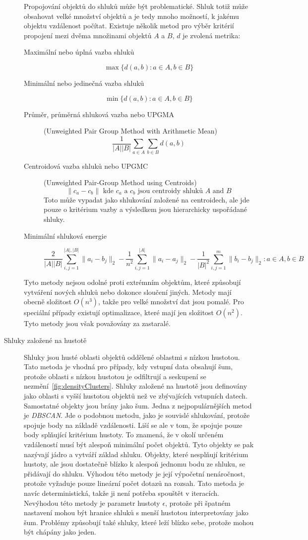 \begin{description}
Propojování objektů do shluků může být problematické. Shluk totiž může obsahovat velké množství objektů a je tedy mnoho možností, k jakému objektu vzdálenost počítat. Existuje několik metod pro výběr kritérií propojení mezi dvěma množinami objektů $A$ a $B$, $d$ je zvolená metrika:
\begin{description}
\item[Maximální nebo úplná vazba shluků] $$\max\{d(a,b) : a \in A, b \in B\}$$
\item[Minimální nebo jedinečná vazba shluků] $$\min\{d(a,b) : a \in A, b \in B\}$$
\item[Průměr, průměrná shluková vazba nebo UPGMA] (Unweighted Pair Group Method with Arithmetic Mean) $$\frac{1}{|A||B|}\sum_{a \in A} \sum_{b \in B} d(a,b)$$
\item[Centroidová vazba shluků nebo UPGMC] (Unweighted Pair-Group Method using Centroids) $$\|c_a - c_b\| \mbox{ kde } c_a \mbox{ a } c_b \mbox{ jsou centroidy shluků } A \mbox{ and } B$$
Toto může vypadat jako shlukování založené na centroidech, ale jde pouze o kritérium vazby a výsledkem jsou hierarchicky uspořádané shluky.
\item[Minimální shluková energie] $$\frac{2}{|A||B|}\sum_{i,j=1}^{|A|,|B|}\|a_i-b_j\|_2-\frac{1}{n^2}\sum_{i,j=1}^{|A|}\|a_i-a_j\|_2-\frac{1}{|B|^2}\sum_{i,j=1}^{m}\|b_{i}-b_{j}\|_{2} : a \in A, b \in B$$
\end{description}

Tyto metody nejsou odolné proti extrémním objektům, které způsobují vytváření nových shluků nebo dokonce sloučení jiných. Metody mají obecně složitost $O(n^3) $, takže pro velké množství dat jsou pomalé. Pro speciální případy existují optimalizace, které mají jen složitost $O(n^2) $. Tyto metody jsou však považovány za zastaralé.

\item[Shluky založené na hustotě] Shluky jsou husté oblasti objektů oddělené oblastmi s nízkou hustotou. Tato metoda je vhodná pro případy, kdy vstupní data obsahují šum, protože oblasti s nízkou hustotou je odfiltrují a seskupení se nezmění~\autoref{fig:densityClusters}.
Shluky založené na hustotě jsou definovány jako oblasti s vyšší hustotou objektů než ve zbývajících vstupních datech. Samostatné objekty jsou brány jako šum. Jedna z nejpopulárnějších metod je \textit{DBSCAN}. Jde o podobnou metodu, jako je souvislé shlukování, protože spojuje body na základě vzdálenosti. Liší se ale v tom, že spojuje pouze body splňující kritérium hustoty. To znamená, že v okolí určeném vzdáleností musí být alespoň minimální počet objektů. Tyto objekty se pak nazývají jádro a vytváří základ shluku. Objekty, které nesplňují kritérium hustoty, ale jsou dostatečně blízko k alespoň jednomu bodu ze shluku, se přidávají do shluku.
Výhodou této metody je její výpočetní nenáročnost, protože vyžaduje pouze lineární počet dotazů na rozsah. Tato metoda je navíc deterministická, takže ji není potřeba spouštět v iteracích.
Nevýhodou této metody je parametr hustoty $\epsilon$, protože při špatném nastavení mohou být hranice shluků s menší hustotou interpretovány jako šum. Problémy způsobují také shluky, které leží blízko sebe, protože mohou být chápány jako jeden.


\end{description}
